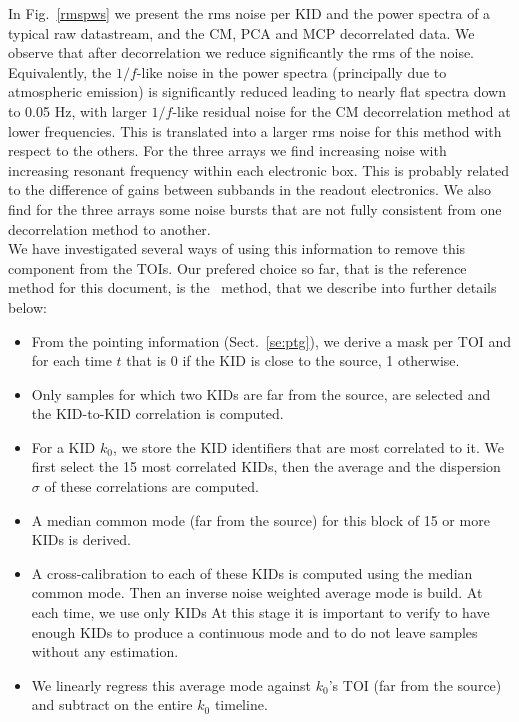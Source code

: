 In Fig.~\ref{rmspws} we present the rms noise per KID and the power spectra of
a typical raw datastream, and the CM, PCA and MCP decorrelated data. We observe that after
decorrelation we reduce significantly the rms of the
noise. Equivalently, the $1/f$-like noise in the power spectra
(principally due to atmospheric emission)
is significantly reduced leading to nearly flat spectra down to 0.05 Hz, with
larger $1/f$-like residual noise for the CM decorrelation method at lower
frequencies. This is translated into a larger rms noise for this method with
respect to the others. For the three arrays we find increasing noise with
increasing resonant frequency within each electronic box. This is probably
related to the difference of gains between subbands in the readout
electronics. We also find for the three arrays some noise bursts that are not
fully consistent from one decorrelation method to another. \\

We have investigated several ways of using this information to remove this
component from the TOIs. Our prefered choice so far, that is the reference
method for this document, is the \cmoneb\ method, that we describe into further
details below:

\begin{itemize}
\item From the pointing information (Sect.~\ref{se:ptg}), we derive a mask per TOI
  and for each time $t$ that is 0 if the KID is close to the source, 1
  otherwise. 
\item Only samples for which two KIDs are far from the source,
   are selected and the KID-to-KID
  correlation is computed.
  
\item For a KID $k_0$, we store the KID identifiers that are most
  correlated to it. We first select the 15 most correlated KIDs, then 
  the average and the dispersion $\sigma$ of these correlations are
  computed. 
\item A median common mode (far from the source) for this block of 15
  or more KIDs is derived.
\item A cross-calibration to each of these KIDs is computed using the
  median common mode. Then an inverse noise weighted average mode is build. At each time, we use
  only KIDs 
  At this stage it is important to verify to have enough KIDs to produce a
  continuous mode and to do not leave samples without any estimation.
\item We linearly regress this average mode against $k_0$'s TOI (far from the
  source) and subtract on the entire $k_0$ timeline.
\end{itemize}

